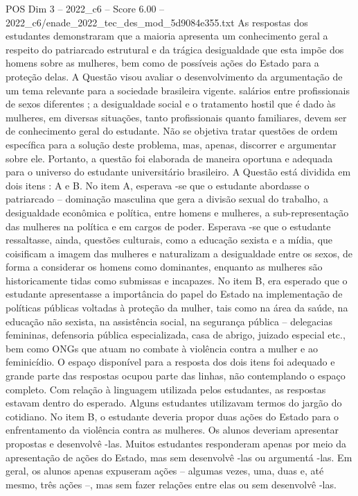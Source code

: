 \begin{textsample}{POS Dim 3 – 2022\_c6 – Score 6.00 – 2022\_c6/enade\_2022\_tec\_des\_mod\_5d9084e355.txt}
As respostas dos estudantes demonstraram que a maioria apresenta um conhecimento geral a respeito do patriarcado estrutural e da trágica desigualdade que esta impõe dos homens sobre as mulheres, bem como de possíveis ações do Estado para a proteção delas.
A Questão visou avaliar o desenvolvimento da argumentação de um tema relevante para a sociedade brasileira vigente. salários entre profissionais de sexos diferentes ; a desigualdade social e o tratamento hostil que é dado às mulheres, em diversas situações, tanto profissionais quanto familiares, devem ser de conhecimento geral do estudante.
Não se objetiva tratar questões de ordem específica para a solução deste problema, mas, apenas, discorrer e argumentar sobre ele.
Portanto, a questão foi elaborada de maneira oportuna e adequada para o universo do estudante universitário brasileiro.
A Questão está dividida em dois itens : A e B.
No item A, esperava -se que o estudante abordasse o patriarcado – dominação masculina que gera a divisão sexual do trabalho, a desigualdade econômica e política, entre homens e mulheres, a sub-representação das mulheres na política e em cargos de poder.
Esperava -se que o estudante ressaltasse, ainda, questões culturais, como a educação sexista e a mídia, que coisificam a imagem das mulheres e naturalizam a desigualdade entre os sexos, de forma a considerar os homens como dominantes, enquanto as mulheres são historicamente tidas como submissas e incapazes.
No item B, era esperado que o estudante apresentasse a importância do papel do Estado na implementação de políticas públicas voltadas à proteção da mulher, tais como na área da saúde, na educação não sexista, na assistência social, na segurança pública – delegacias femininas, defensoria pública especializada, casa de abrigo, juizado especial etc., bem como ONGs que atuam no combate à violência contra a mulher e ao feminicídio.
O espaço disponível para a resposta dos dois itens foi adequado e grande parte das respostas ocupou parte das linhas, não contemplando o espaço completo.
Com relação à linguagem utilizada pelos estudantes, as respostas estavam dentro do esperado.
Alguns estudantes utilizavam termos do jargão do cotidiano.
No item B, o estudante deveria propor duas ações do Estado para o enfrentamento da violência contra as mulheres.
Os alunos deveriam apresentar propostas e desenvolvê -las.
Muitos estudantes responderam apenas por meio da apresentação de ações do Estado, mas sem desenvolvê -las ou argumentá -las.
Em geral, os alunos apenas expuseram ações – algumas vezes, uma, duas e, até mesmo, três ações –, mas sem fazer relações entre elas ou sem desenvolvê -las.

\end{textsample}
